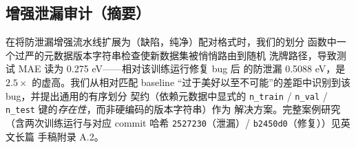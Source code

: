 \documentclass[UTF8,11pt,a4paper]{ctexart}
\begin{document}
\subsection{增强泄漏审计（摘要）}\label{app:short_leak}

在将防泄漏增强流水线扩展为（缺陷，纯净）配对格式时，我们的划分
函数中一个过严的元数据版本字符串检查使新数据集被悄悄路由到随机
洗牌路径，导致测试 MAE 读为 0.275 eV——相对该训练运行修复 bug 后
的防泄漏 0.5088 eV，是 $2.5\times$ 的虚高。我们从相对匹配 baseline
``过于美好以至不可能''的差距中识别到该 bug，并提出通用的有序划分
契约（依赖元数据中显式的 \texttt{n\_train} / \texttt{n\_val} /
\texttt{n\_test} 键的\emph{存在性}，而非硬编码的版本字符串）作为
解决方案。完整案例研究（含两次训练运行与对应 commit 哈希
\texttt{2527230}（泄漏）/ \texttt{b2450d0}（修复））见英文长篇
手稿附录 A.2。
\end{document}
